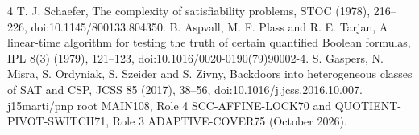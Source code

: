 \documentclass[11pt]{article}
\begin{document}
\begin{thebibliography}{4}
 T. J. Schaefer, The complexity of satisfiability problems,
STOC (1978), 216--226, doi:10.1145/800133.804350.
 B. Aspvall, M. F. Plass and R. E. Tarjan,
A linear-time algorithm for testing the truth of certain quantified
Boolean formulas, IPL 8(3) (1979), 121--123,
doi:10.1016/0020-0190(79)90002-4.
 S. Gaspers, N. Misra, S. Ordyniak, S. Szeider
and S. Zivny, Backdoors into heterogeneous classes of SAT and CSP,
JCSS 85 (2017), 38--56, doi:10.1016/j.jcss.2016.10.007.
 j15marti/pnp root MAIN108, Role 4 SCC-AFFINE-LOCK70
and QUOTIENT-PIVOT-SWITCH71, Role 3 ADAPTIVE-COVER75 (October 2026).
\end{thebibliography}
\end{document}
